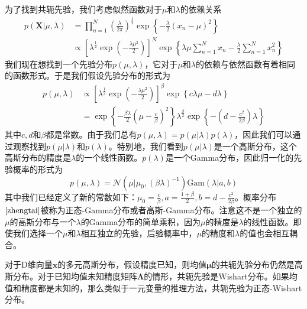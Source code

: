 \begin{enumerate}
	为了找到共轭先验，我们考虑似然函数对于$\mu$和$\lambda$的依赖关系
	\begin{equation}
		\begin{aligned}
			p(\boldsymbol{X}|\mu,\lambda)&=\prod_{n=1}^{N}\left(\frac{\lambda}{2\pi}\right)^{\frac{1}{2}}\exp\left\{-\frac{\lambda}{2}(x_n-\mu)^2 \right\}\\
			&\propto \left[\lambda^{\frac{1}{2}}\exp\left(-\frac{\lambda\mu^2}{2} \right) \right]^N\exp\left\{\lambda\mu\sum_{n=1}^{N}x_n-\frac{\lambda}{2}\sum_{n=1}^{N}x_n^2 \right\}
		\end{aligned}
	\end{equation}
	我们现在想找到一个先验分布$p(\mu,\lambda)$，它对于$\mu$和$\lambda$的依赖与依然函数有着相同的函数形式。于是我们假设先验分布的形式为
	\begin{equation}
	\begin{aligned}
		p(\mu,\lambda)&\propto \left[\lambda^{\frac{1}{2}}\exp\left(-\frac{\lambda\mu^2}{2} \right) \right]^{\beta}\exp\left\{c\lambda\mu-d\lambda \right\}\\
		&=\exp\left\{-\frac{\beta\lambda}{2}(\mu-\frac{c}{\beta})^2 \right\}\lambda^{\frac{\beta}{2}}\exp\left\{-\left(d-\frac{c^2}{2\beta} \right)\lambda \right\}
	\end{aligned}
	\end{equation}
	其中$c,d$和$\beta$都是常数。由于我们总有$p(\mu,\lambda)=p(\mu|\lambda)p(\lambda)$，因此我们可以通过观察找到$p(\mu|\lambda)$和$p(\lambda)$。特别地，我们看到$p(\mu|\lambda)$是一个高斯分布，这个高斯分布的精度是$\lambda$的一个线性函数。$p(\lambda)$是一个Gamma分布，因此归一化的先验概率的形式为
	\begin{equation}
	\label{zhengtai}
		p(\mu,\lambda)=\mathcal{N}(\mu|\mu_0,(\beta\lambda)^{-1})\mathrm{Gam}(\lambda|a,b)
	\end{equation}
	其中我们已经定义了新的常数如下：$\mu_0=\frac{c}{\beta},a=\frac{1+\beta}{2},b=d-\frac{c^2}{2\beta}$。概率分布$\ref{zhengtai}$被称为正态-Gamma分布或者高斯-Gamma分布。注意这不是一个独立的$\mu$的高斯分布与一个$\lambda$的Gamma分布的简单乘积，因为$\mu$的精度是$\lambda$的线性函数。即使我们选择一个$\mu$和$\lambda$相互独立的先验，后验概率中，$\mu$的精度和$\lambda$的值也会相互耦合。
	
	对于D维向量$\boldsymbol{x}$的多元高斯分布，假设精度已知，则均值$\boldsymbol{\mu}$的共轭先验分布仍然是高斯分布。对于已知均值未知精度矩阵$\boldsymbol{\Lambda}$的情形，共轭先验是Wishart分布。如果均值和精度都是未知的，那么类似于一元变量的推理方法，共轭先验为正态-Wishart分布。
\end{enumerate}
